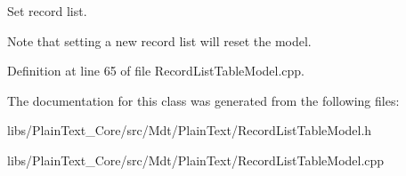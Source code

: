 Set record list. 

Note that setting a new record list will reset the model. 

Definition at line 65 of file Record\+List\+Table\+Model.\+cpp.



The documentation for this class was generated from the following files\+:\begin{DoxyCompactItemize}
\item 
libs/\+Plain\+Text\+\_\+\+Core/src/\+Mdt/\+Plain\+Text/Record\+List\+Table\+Model.\+h\item 
libs/\+Plain\+Text\+\_\+\+Core/src/\+Mdt/\+Plain\+Text/Record\+List\+Table\+Model.\+cpp\end{DoxyCompactItemize}
